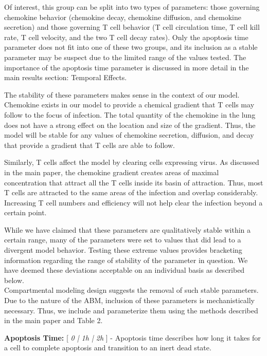 \documentclass[preprint,10pt,authoryear]{elsarticle}
\begin{document}
Of interest, this group can be split into two types of parameters: those governing chemokine behavior (chemokine decay, chemokine diffusion, and chemokine secretion) and those governing T cell behavior (T cell circulation time, T cell kill rate, T cell velocity, and the two T cell decay rates).  Only the apoptosis time parameter does not fit into one of these two groups, and its inclusion as a stable parameter may be suspect due to the limited range of the values tested.  The importance of the apoptosis time parameter is discussed in more detail in the main results section: Temporal Effects.  

The stability of these parameters makes sense in the context of our model.  Chemokine exists in our model to provide a chemical gradient that T cells may follow to the focus of infection.  The total quantity of the chemokine in the lung does not have a strong effect on the location and size of the gradient.  Thus, the model will be stable for any values of chemokine secretion, diffusion, and decay that provide a gradient that T cells are able to follow.

Similarly, T cells affect the model by clearing cells expressing virus.  As discussed in the main paper, the chemokine gradient creates areas of maximal concentration that attract all the T cells inside its basin of attraction.  Thus, most T cells are attracted to the same areas of the infection and overlap considerably.  Increasing T cell numbers and efficiency will not help clear the infection beyond a certain point.

While we have claimed that these parameters are qualitatively stable within a certain range, many of the parameters were set to values that did lead to a divergent model behavior.  Testing these extreme values provides bracketing information regarding the range of stability of the parameter in question.  We have deemed these deviations acceptable on an individual basis as described below. \\

Compartmental modeling design suggests the removal of such stable parameters.  Due to the nature of the ABM, inclusion of these parameters is mechanistically necessary.  Thus, we include and parameterize them using the methods described in the main paper and Table 2.

\textbf{Apoptosis Time:} [ \textit{0 | 1h | 2h} ] - Apoptosis time describes how long it takes for a cell to complete apoptosis and transition to an inert dead state.  
\end{document}
